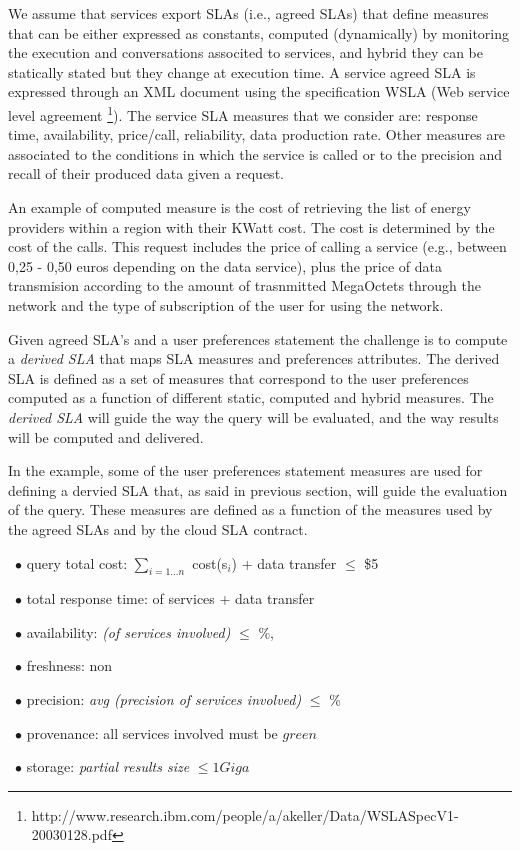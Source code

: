 
We assume that services export SLAs (i.e., agreed SLAs) that define measures   that can be either expressed as constants,  computed (dynamically) by monitoring the execution and conversations associted to services, and hybrid they can be statically stated  but they change at execution time.  A service  agreed SLA is expressed through an  XML document using the specification WSLA (Web service level agreement \footnote{\footnotesize http://www.research.ibm.com/people/a/akeller/\-Data/WSLASpecV1-20030128.pdf}). The service SLA measures  that we consider are: response time, availability, price/call, reliability, data production rate. Other measures are associated to the conditions in which the service is called or to the precision and recall of their produced data given a request. 

An example of computed measure is the cost of retrieving the list of energy providers within a region with their KWatt cost. The cost is determined by the  cost of the calls. This request  includes the price of calling a service (e.g.,  between 0,25 - 0,50 euros depending on the data service), plus the price of data transmision according to the amount of trasnmitted MegaOctets through the network and the type of subscription of the user for using the network. 

Given agreed SLA's and a user preferences statement the challenge is to compute a  {\em derived SLA} that  maps SLA measures and preferences attributes.  The derived SLA is defined as a set of measures that correspond to the user preferences computed as a function of different static, computed and hybrid measures. The {\em derived SLA}  will guide the way the query will be evaluated, and the way results will be computed and delivered.

In the example, some of the user preferences statement measures are used for defining a dervied SLA that, as said in previous section, will guide the evaluation of the query. These measures are defined as a function of the measures used by the agreed SLAs and by the cloud SLA contract.
\begin{trivlist}\sf\footnotesize
\item[~$\bullet$ ] query total cost: $\sum_{i = 1\dots n}$ cost(s$_i$) + data transfer $\leq$ \$5
 \item[~$\bullet$ ] total response time: of services + data transfer
 \item[~$\bullet$ ] availability: {\em (of services involved)} $\leq$ {$\%$}, 
 \item[~$\bullet$ ] freshness: non 
 \item[~$\bullet$ ] precision: {\em avg (precision of services involved)} $\leq$ {$\%$}
 \item[~$\bullet$ ] provenance:  all services involved must be $green$
 \item[~$\bullet$ ] storage: {\em partial results size} $\leq 1 Giga$ 
 \end{trivlist} 
 
